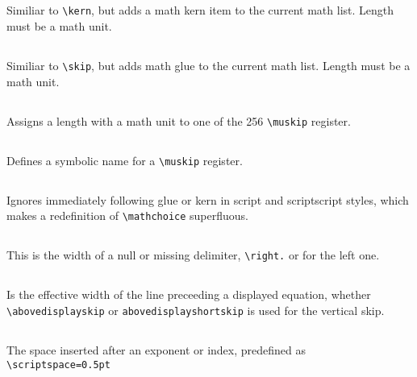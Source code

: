 \begin{table}[htb]
\subsection{}
Similiar to \verb+\kern+, but adds a math kern item to the current math list. Length must be a math unit.

\subsection{}
Similiar to \verb+\skip+, but adds math glue to the current math list. Length must be a math unit.

\subsection{}
Assigns a length with a math unit to one of the 256 \verb+\muskip+ register.

\subsection{}
Defines a symbolic name for a \verb+\muskip+ register.

\subsection{}
Ignores immediately following glue or kern in script and 
scriptscript styles, which makes a redefinition of \verb+\mathchoice+ superfluous.

\subsection{}
This is the width of a null or missing delimiter, 
\eg \verb+\right.+ or for the left one.

\subsection{}
Is the effective width of the line preceeding a displayed equation, whether 
\verb+\abovedisplayskip+ or \verb+abovedisplayshortskip+ is used for the vertical skip. 

\subsection{}
The space inserted after an exponent or index, predefined as \verb+\scriptspace=0.5pt+    %


\end{table}
